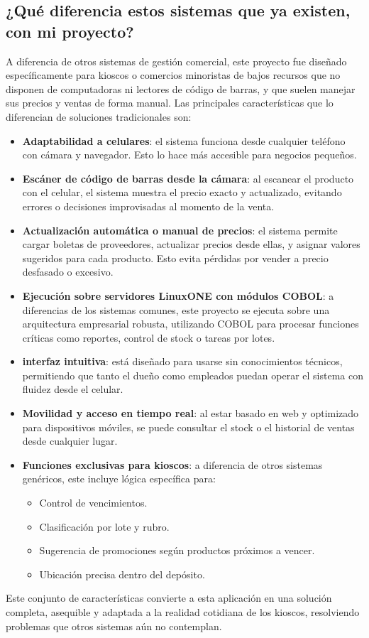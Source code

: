 \documentclass[twoside]{article}
\begin{document}
\subsection{¿Qué diferencia estos sistemas que ya existen, con mi proyecto?}
A diferencia de otros sistemas de gestión comercial, este proyecto fue diseñado específicamente para kioscos o comercios minoristas de bajos recursos que no disponen de computadoras ni lectores de código de barras, y que suelen manejar sus precios y ventas de forma manual.
Las principales características que lo diferencian de soluciones tradicionales son:
\begin{itemize}
	\item \textbf{Adaptabilidad a celulares}: el sistema funciona desde cualquier teléfono con cámara y navegador. Esto lo hace más accesible para negocios pequeños.
	\item \textbf{Escáner de código de barras desde la cámara}: al escanear el producto con el celular, el sistema muestra el precio exacto y actualizado, evitando errores o decisiones improvisadas al momento de la venta.
	\item \textbf{Actualización automática o manual de precios}: el sistema permite cargar boletas de proveedores, actualizar precios desde ellas, y asignar valores sugeridos para cada producto. Esto evita pérdidas por vender a precio desfasado o excesivo.
	\item \textbf{Ejecución sobre servidores LinuxONE con módulos COBOL}: a diferencias de los sistemas comunes, este proyecto se ejecuta sobre una arquitectura empresarial robusta, utilizando COBOL para procesar funciones críticas como reportes, control de stock o tareas por lotes.
	\item \textbf{interfaz intuitiva}: está diseñado para usarse sin conocimientos técnicos, permitiendo que tanto el dueño como empleados puedan operar el sistema con fluidez desde el celular.
	\item \textbf{Movilidad y acceso en tiempo real}: al estar basado en web y optimizado para dispositivos móviles, se puede consultar el stock o el historial de ventas desde cualquier lugar.
    \item \textbf{Funciones exclusivas para kioscos}: a diferencia de otros sistemas genéricos, este incluye lógica específica para:
    \begin{itemize}
        \item Control de vencimientos.
        \item Clasificación por lote y rubro.
        \item Sugerencia de promociones según productos próximos a vencer.
        \item Ubicación precisa dentro del depósito.
    \end{itemize}
\end{itemize}
Este conjunto de características convierte a esta aplicación en una solución completa, asequible y adaptada a la realidad cotidiana de los kioscos, resolviendo problemas que otros sistemas aún no contemplan.
\end{document}
